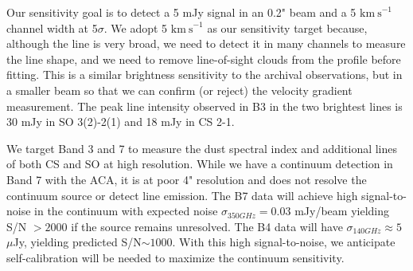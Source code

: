 \documentclass[12pt,a4paper]{article}  %
\newcommand{\kms}{\ensuremath{\mathrm{km~s}^{-1}}\xspace}
\begin{document}


Our sensitivity goal is to detect a 5 mJy signal in an 0.2" beam and a 5 \kms channel width at 5$\sigma$.
We adopt 5 \kms as our sensitivity target because, although the line is very broad, we need to detect it in many channels to measure the line shape, and we need to remove line-of-sight clouds from the profile before fitting.
This is a similar brightness sensitivity to the archival observations, but in a smaller beam so that we can confirm (or reject) the velocity gradient measurement.
The peak line intensity observed in B3 in the two brightest lines is 30 mJy in SO 3(2)-2(1) and 18 mJy in CS 2-1.

We target Band 3 and 7 to measure the dust spectral index and additional lines of both CS and SO at high resolution.
While we have a continuum detection in Band 7 with the ACA, it is at poor 4" resolution and does not resolve the continuum source or detect line emission.
The B7 data will achieve high signal-to-noise in the continuum with expected noise $\sigma_{350 GHz}=0.03$ mJy/beam yielding S/N $> 2000$ if the source remains unresolved.
The B4 data will have $\sigma_{140 GHz}\approx5$ $\mu$Jy, yielding predicted S/N$\sim1000$.
With this high signal-to-noise, we anticipate self-calibration will be needed to maximize the continuum sensitivity.
\end{document}
